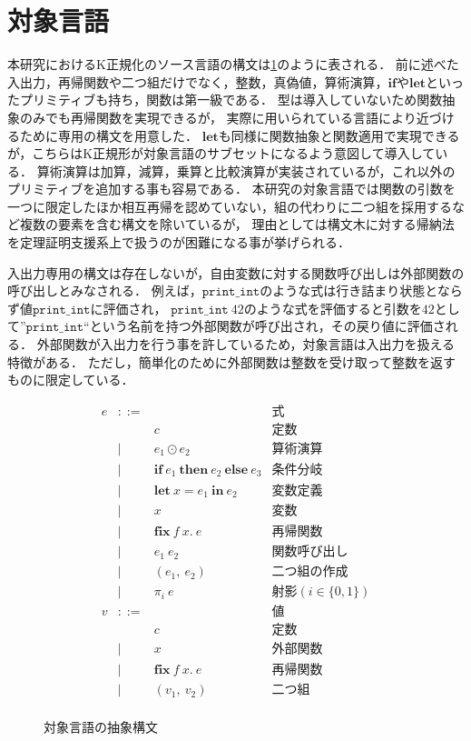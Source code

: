 \documentclass[T]{compsoft}
\newcommand{\keyword}[1]{\mathbf{#1}}
\newcommand{\IF}{\keyword{if}}
\newcommand{\THEN}{\keyword{then}}
\newcommand{\ELSE}{\keyword{else}}
\newcommand{\LET}{\keyword{let}}
\newcommand{\FIX}{\keyword{fix}}
\newcommand{\IN}{\keyword{in}}
\begin{document}
\section{対象言語}
本研究におけるK正規化のソース言語の構文は\figurename\ref{eqn:mincaml-ast}のように表される．
前に述べた入出力，再帰関数や二つ組だけでなく，整数，真偽値，算術演算，$\IF$や$\LET$といったプリミティブも持ち，関数は第一級である．
型は導入していないため関数抽象のみでも再帰関数を実現できるが，
実際に用いられている言語により近づけるために専用の構文を用意した．
$\LET$も同様に関数抽象と関数適用で実現できるが，こちらはK正規形が対象言語のサブセットになるよう意図して導入している．
算術演算は加算，減算，乗算と比較演算が実装されているが，これ以外のプリミティブを追加する事も容易である．
本研究の対象言語では関数の引数を一つに限定したほか相互再帰を認めていない，組の代わりに二つ組を採用するなど複数の要素を含む構文を除いているが，
理由としては構文木に対する帰納法を定理証明支援系上で扱うのが困難になる事が挙げられる．

入出力専用の構文は存在しないが，自由変数に対する関数呼び出しは外部関数の呼び出しとみなされる．
例えば，$\texttt{print\_int}$のような式は行き詰まり状態とならず値$\texttt{print\_int}$に評価され，
$\texttt{print\_int}~42$のような式を評価すると引数を$42$として''$\texttt{print\_int}$``という名前を持つ外部関数が呼び出され，その戻り値に評価される．
外部関数が入出力を行う事を許しているため，対象言語は入出力を扱える特徴がある．
ただし，簡単化のために外部関数は整数を受け取って整数を返すものに限定している．

\begin{figure}[htbp]
	\[ \begin{array}{lcll}
		e & ::= & & \mbox{式} \\
				& & c	& \mbox{定数} \\
				& | & e_1 \odot e_2 & \mbox{算術演算} \\
				& | & \IF~e_1~\THEN~e_2~\ELSE~e_3 & \mbox{条件分岐} \\
				& | & \LET~x=e_1~\IN~e_2 & \mbox{変数定義} \\
				& | & x & \mbox{変数} \\
				& | & \FIX~f~x.~e & \mbox{再帰関数} \\
				& | & e_1~e_2 & \mbox{関数呼び出し} \\
				& | & (e_1,~e_2) & \mbox{二つ組の作成} \\
				& | & \pi_i~e & \mbox{射影}(i \in \{0, 1\}) \\
			v & ::= & & \mbox{値} \\
				& & c & \mbox{定数} \\
				& | & x & \mbox{外部関数} \\
				& | & \FIX~f~x.~e & \mbox{再帰関数} \\
				& | & (v_1,~v_2) & \mbox{二つ組} \\
	\end{array} \]
	\caption{対象言語の抽象構文}
	\label{eqn:mincaml-ast}
\end{figure}
\end{document}
